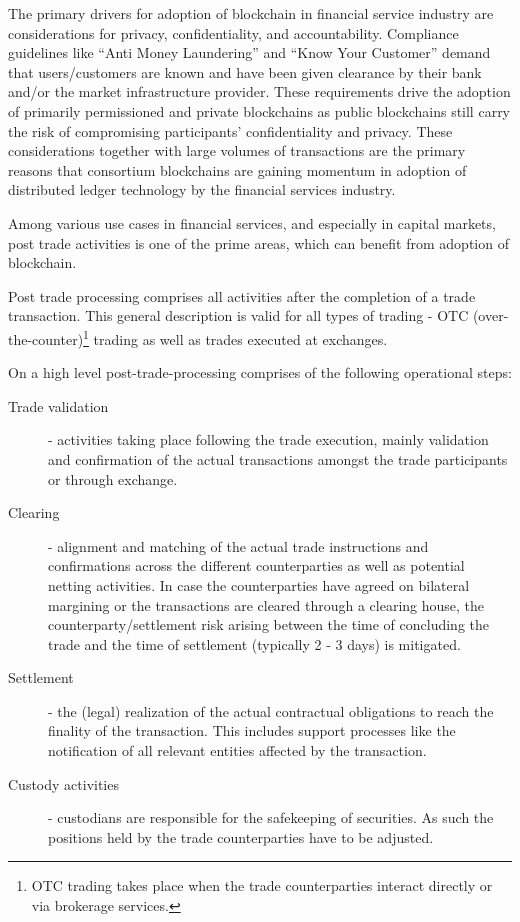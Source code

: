 The primary drivers for adoption of blockchain in financial service industry are considerations for privacy, confidentiality, and accountability. Compliance guidelines like “Anti Money Laundering” and “Know Your Customer” demand that users/customers are known and have been given clearance by their bank and/or the market infrastructure provider. These requirements drive the adoption of primarily permissioned and private blockchains as public blockchains still carry the risk of compromising participants' confidentiality and privacy. These considerations together with large volumes of transactions are the primary reasons that consortium blockchains are gaining momentum in adoption of distributed ledger technology by the financial services industry.

Among various use cases in financial services, and especially in capital markets, post trade activities is one of the prime areas, which can benefit from adoption of blockchain.

Post trade processing comprises all activities after the completion of a trade transaction. This general description is valid for all types of trading - OTC (over-the-counter)\footnote{OTC trading takes place when the trade counterparties interact directly or via brokerage services.} trading as well as trades executed at exchanges.

On a high level post-trade-processing comprises of the following operational steps:
\begin{description}
\item [Trade validation] - activities taking place following the trade execution, mainly validation and confirmation of the actual transactions amongst the trade participants or through exchange. 
\item [Clearing] - alignment and  matching of the actual trade instructions and confirmations across the different counterparties as well as potential netting activities. In case the counterparties have agreed on bilateral margining or the transactions are cleared through a clearing house, the counterparty/settlement risk arising between the time of concluding the trade and the time of settlement (typically 2 - 3 days) is mitigated. 
\item [Settlement] - the (legal) realization of the actual contractual obligations to reach the finality of the transaction. This includes support processes like the notification of all relevant entities affected by the transaction.
\item [Custody activities] - custodians are responsible for the safekeeping of securities. As such the positions held by the trade counterparties have to be adjusted. 
\end{description}

